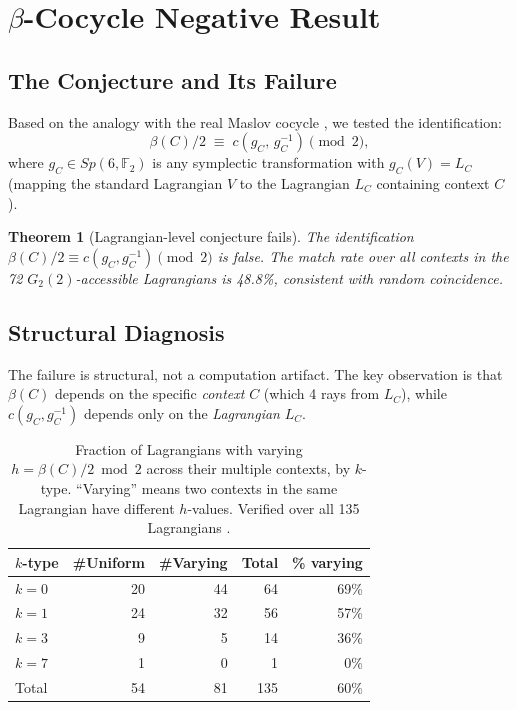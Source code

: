 \documentclass[11pt,a4paper]{article}
\newtheorem{theorem}{Theorem}[section]
\theoremstyle{remark}
\begin{document}
\section{\texorpdfstring{$\beta$-Cocycle Negative Result}{beta-Cocycle Negative Result}}\label{sec:betaneg}

\subsection{The Conjecture and Its Failure}

Based on the analogy with the real Maslov cocycle \cite{LionVergne1980},
we tested the identification:
\[
  \beta(C)/2 \;\equiv\; c(g_C,\, g_C^{-1}) \pmod 2,
\]
where $g_C \in Sp(6,\mathbb{F}_2)$ is any symplectic transformation with
$g_C(V) = L_C$ (mapping the standard Lagrangian $V$ to the Lagrangian $L_C$
containing context $C$).

\begin{theorem}[Lagrangian-level conjecture fails]\label{thm:betafails}
The identification $\beta(C)/2 \equiv c(g_C, g_C^{-1}) \pmod 2$ is false.
The match rate over all contexts in the 72 $G_2(2)$-accessible Lagrangians
is 48.8\%, consistent with random coincidence.
\end{theorem}

\subsection{Structural Diagnosis}

The failure is structural, not a computation artifact.
The key observation is that $\beta(C)$ depends on the specific \emph{context}
$C$ (which 4 rays from $L_C$), while $c(g_C, g_C^{-1})$ depends only on
the \emph{Lagrangian} $L_C$.

\begin{table}[H]
\centering
\caption{Fraction of Lagrangians with varying $h = \beta(C)/2 \bmod 2$
across their multiple contexts, by $k$-type.
``Varying'' means two contexts in the same Lagrangian have different $h$-values.
Verified over all 135 Lagrangians \cite{PaperXVsuppl}.}
\label{tab:lagvarying}
\begin{tabular}{lrrrr}
\toprule
$k$-type & \#Uniform & \#Varying & Total & \% varying \\
\midrule
$k = 0$ & 20 & 44 & 64 & 69\% \\
$k = 1$ & 24 & 32 & 56 & 57\% \\
$k = 3$ &  9 &  5 & 14 & 36\% \\
$k = 7$ &  1 &  0 &  1 & 0\% \\
\midrule
Total   & 54 & 81 & 135 & 60\% \\
\bottomrule
\end{tabular}
\end{table}
\end{document}
